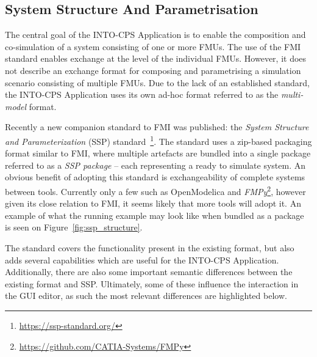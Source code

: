 \subsection{System Structure And Parametrisation}\label{sec:SSP}

The central goal of the INTO-CPS Application is to enable the composition and co-simulation of a system consisting of one or more FMUs. 
The use of the FMI standard enables exchange at the level of the individual FMUs.
However, it does not describe an exchange format for composing and parametrising a simulation scenario consisting of multiple FMUs.
Due to the lack of an established standard, the INTO-CPS Application uses its own ad-hoc format referred to as the \emph{multi-model} format.

Recently a new companion standard to FMI was published: the \emph{System Structure and Parameterization} (SSP) standard~\cite{SSP19}\footnote{\url{https://ssp-standard.org/}}.
The standard uses a zip-based packaging format similar to FMI, where multiple artefacts are bundled into a single package referred to as a \emph{SSP package} -- each representing a ready to simulate system.
An obvious benefit of adopting this standard is exchangeability of complete systems between tools. Currently only a few such as OpenModelica and \emph{FMPy}\footnote{\url{https://github.com/CATIA-Systems/FMPy}}, however given its close relation to FMI, it seems likely that more tools will adopt it. 
An example of what the running example may look like when bundled as a package is seen on Figure~\ref{fig:ssp_structure}.

The standard covers the functionality present in the existing format, but also adds several capabilities which are useful for the INTO-CPS Application.
Additionally, there are also some important semantic differences between the existing format and SSP.
Ultimately, some of these influence the interaction in the GUI editor, as such the most relevant differences are highlighted below.

